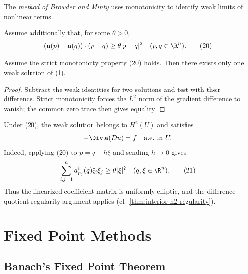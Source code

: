\begin{remark}
\label{rem:browder-minty-method}
The \textit{method of Browder and Minty} uses monotonicity to identify weak limits of nonlinear terms.
\end{remark}

Assume additionally that, for some $\theta>0$,
\[
(\mathbf a(p)-\mathbf a(q))\cdot(p-q)\geq\theta|p-q|^2
\quad(p,q\in\R^n).
\tag{20}
\]

\begin{theorem}
\label{thm:monotonicity-uniqueness-weak-solution}
Assume the strict monotonicity property (20) holds. Then there exists only one weak solution of (1).
\end{theorem}

\begin{proof}
\sketch Subtract the weak identities for two solutions and test with their difference. Strict monotonicity forces the $L^2$ norm of the gradient difference to vanish; the common zero trace then gives equality.
\end{proof}

\begin{remark}
\label{rem:monotonicity-h2-regularity}
Under (20), the weak solution belongs to $H^2(U)$ and satisfies
\[
-\Div\,\mathbf{a}(Du) = f \quad \text{a.e. in } U.
\]
Indeed, applying (20) to $p=q+h\xi$ and sending $h\to0$ gives
\[
\sum_{i,j=1}^{n} a^i_{p_j}(q)\xi_i\xi_j \geq \theta|\xi|^2 \quad (q, \xi \in \R^n).
\tag{21}
\]
Thus the linearized coefficient matrix is uniformly elliptic, and the difference-quotient regularity argument applies (cf.\ \cref{thm:interior-h2-regularity}).
\end{remark}

\section{Fixed Point Methods}
\label{sec:fixed-point-methods}

\subsection{Banach's Fixed Point Theorem}
\label{sec:banachs-fixed-point-theorem}

